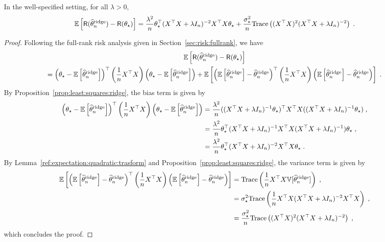 \begin{proposition}
In the well-specified setting, for all $\lambda>0$,
$$
\mathbb{E}\left[\mathsf{R}(\widehat {\theta}^{\mathrm{ridge}}_n) - \mathsf{R}(\theta_\star)\right] = \frac{\lambda^2}{n}\theta_\star^\top(X^\top X + \lambda I_n)^{-2} X^\top X \theta_\star + \frac{\sigma_\star^{2}}{n}\mathrm{Trace}\left((X^\top X)^2(X^\top X + \lambda I_n)^{-2}\right)\;.
$$
\end{proposition}
\begin{proof}
Following the full-rank risk analysis given in Section~\ref{sec:risk:fullrank}, we have
\begin{multline*}
\mathbb{E}\left[\mathsf{R}(\widehat {\theta}^{\mathrm{ridge}}_n) - \mathsf{R}(\theta_\star)\right] \\
=\left(\theta_\star-\mathbb{E}\left[\widehat {\theta}^{\mathrm{ridge}}_n\right]\right)^\top \left(\frac{1}{n}X^\top X\right) \left(\theta_\star-\mathbb{E}\left[\widehat {\theta}^{\mathrm{ridge}}_n\right] \right) + \mathbb{E}\left[ \left(\mathbb{E}\left[\widehat {\theta}^{\mathrm{ridge}}_n\right] - \widehat {\theta}^{\mathrm{ridge}}_n\right)^\top \left(\frac{1}{n}X^\top X\right) \left(\mathbb{E}\left[\widehat {\theta}^{\mathrm{ridge}}_n\right] - \widehat {\theta}^{\mathrm{ridge}}_n\right)\right]\;.
\end{multline*}
By Proposition~\ref{prop:least:squares:ridge}, the bias term is given by
\begin{align*}
\left(\theta_\star-\mathbb{E}\left[\widehat {\theta}^{\mathrm{ridge}}_n\right]\right)^\top \left(\frac{1}{n}X^\top X\right) \left(\theta_\star-\mathbb{E}\left[\widehat {\theta}^{\mathrm{ridge}}_n\right] \right) &= \frac{\lambda^2}{n}((X^\top X + \lambda I_n)^{-1}\theta_\star)^\top X^\top X  ((X^\top X + \lambda I_n)^{-1}\theta_\star)\;,\\
&= \frac{\lambda^2}{n}\theta_\star^\top(X^\top X + \lambda I_n)^{-1} X^\top X  (X^\top X + \lambda I_n)^{-1})\theta_\star\;,\\
&= \frac{\lambda^2}{n}\theta_\star^\top(X^\top X + \lambda I_n)^{-2} X^\top X \theta_\star\;.
\end{align*}
By Lemma~\ref{ref:expectation:quadratic:trasform} and  Proposition~\ref{prop:least:squares:ridge}, the variance term is given by
\begin{align*}
\mathbb{E}\left[ \left(\mathbb{E}\left[\widehat {\theta}^{\mathrm{ridge}}_n\right] - \widehat {\theta}^{\mathrm{ridge}}_n\right)^\top \left(\frac{1}{n}X^\top X\right) \left(\mathbb{E}\left[\widehat {\theta}^{\mathrm{ridge}}_n\right] - \widehat {\theta}^{\mathrm{ridge}}_n\right)\right] &= \mathrm{Trace}\left(\frac{1}{n}X^\top X \mathbb{V}[\widehat {\theta}^{\mathrm{ridge}}_n]\right)\;,\\
&= \sigma_\star^{2}\mathrm{Trace}\left(\frac{1}{n}X^\top X(X^\top X + \lambda I_n)^{-2}X^\top X\right)\;,\\
&= \frac{\sigma_\star^{2}}{n}\mathrm{Trace}\left((X^\top X)^2(X^\top X + \lambda I_n)^{-2}\right)\;,
\end{align*}
which concludes the proof.
\end{proof}
